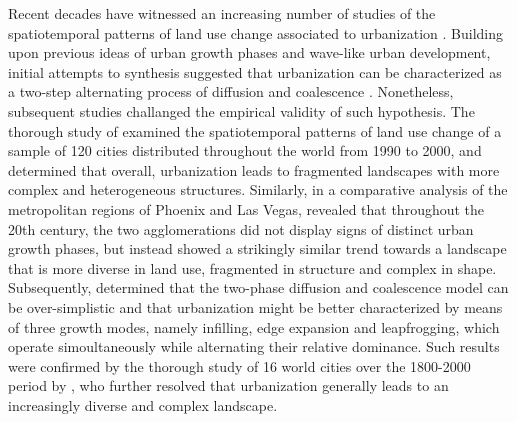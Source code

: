 

Recent decades have witnessed an increasing number of studies of the spatiotemporal patterns of land use change associated to urbanization \citep{dietzel2005spatio, seto2005quantifying, schneider2008compact, jenerette2010global, wu2011quantifying, li2013quantifying, liu2016general, nong2018quantifying}.
Building upon previous ideas of urban growth phases and wave-like urban development, initial attempts to synthesis suggested that urbanization can be characterized as a two-step alternating process of diffusion and coalescence \citep{dietzel2005spatio, schneider2008compact}. Nonetheless, subsequent studies challanged the empirical validity of such hypothesis.
The thorough study of \cite{jenerette2010global} examined the spatiotemporal patterns of land use change of a sample of 120 cities distributed throughout the world from 1990 to 2000, and determined that overall, urbanization leads to fragmented landscapes with more complex and heterogeneous structures.
Similarly, in a comparative analysis of the metropolitan regions of Phoenix and Las Vegas, \cite{wu2011quantifying} revealed that throughout the 20th century, the two agglomerations did not display signs of distinct urban growth phases, but instead showed a strikingly similar trend towards a landscape that is more diverse in land use, fragmented in structure and complex in shape.
Subsequently, \cite{li2013quantifying} determined that the two-phase diffusion and coalescence model can be over-simplistic and that urbanization might be better characterized by means of three growth modes, namely infilling, edge expansion and leapfrogging, which operate simoultaneously while alternating their relative dominance.
Such results were confirmed by the thorough study of 16 world cities over the 1800-2000 period by \cite{liu2016general}, who further resolved that urbanization generally leads to an increasingly diverse and complex landscape.


